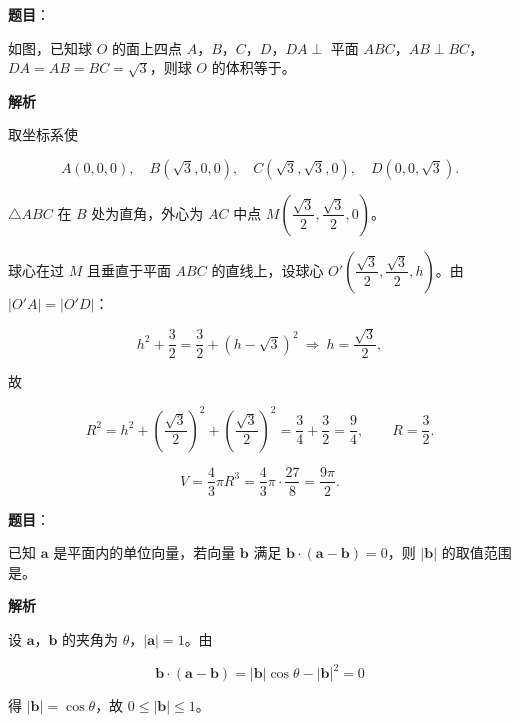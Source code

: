 \begin{answer}

\textbf{题目}：

如图，已知球 $O$ 的面上四点 $A$，$B$，$C$，$D$，$DA\perp$ 平面 $ABC$，$AB\perp BC$，$DA=AB=BC=\sqrt3$，则球 $O$ 的体积等于\gkblank{}。
\nopagebreak[4]
\begin{center}\end{center}
\nopagebreak[4]
\textbf{解析}

取坐标系使

\nopagebreak[4]
\[A(0,0,0),\quad B(\sqrt3,0,0),\quad C(\sqrt3,\sqrt3,0),\quad D(0,0,\sqrt3).\]

$\triangle ABC$ 在 $B$ 处为直角，外心为 $AC$ 中点 $M\left(\dfrac{\sqrt3}2,\dfrac{\sqrt3}2,0\right)$。

球心在过 $M$ 且垂直于平面 $ABC$ 的直线上，设球心 $O'\left(\dfrac{\sqrt3}2,\dfrac{\sqrt3}2,h\right)$。由 $|O'A|=|O'D|$：

\nopagebreak[4]
\[h^2+\frac32=\frac32+(h-\sqrt3)^2\ \Longrightarrow\ h=\frac{\sqrt3}2,\]

故

\nopagebreak[4]
\[R^2=h^2+\left(\frac{\sqrt3}2\right)^2+\left(\frac{\sqrt3}2\right)^2=\frac34+\frac32=\frac94,\qquad R=\frac32.\]

\nopagebreak[4]
\[V=\frac43\pi R^3=\frac43\pi\cdot\frac{27}8=\frac{9\pi}2.\]


\end{answer}
\begin{answer}

\textbf{题目}：

已知 $\boldsymbol a$ 是平面内的单位向量，若向量 $\boldsymbol b$ 满足 $\boldsymbol b\cdot(\boldsymbol a-\boldsymbol b)=0$，则 $|\boldsymbol b|$ 的取值范围是\gkblank{}。

\textbf{解析}

设 $\boldsymbol a$，$\boldsymbol b$ 的夹角为 $\theta$，$|\boldsymbol a|=1$。由

\nopagebreak[4]
\[\boldsymbol b\cdot(\boldsymbol a-\boldsymbol b)=|\boldsymbol b|\cos\theta-|\boldsymbol b|^2=0\]

得 $|\boldsymbol b|=\cos\theta$，故 $0\leqslant|\boldsymbol b|\leqslant1$。


\end{answer}
